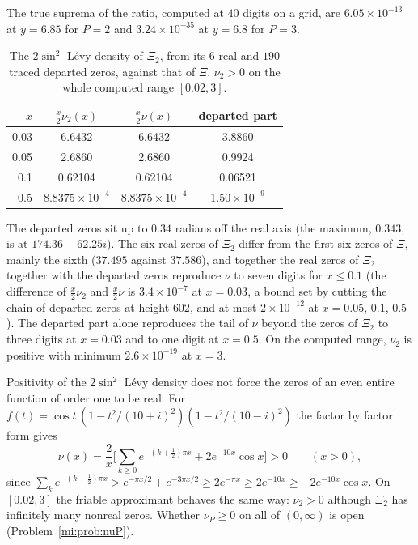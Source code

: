 The true suprema of the ratio, computed at $40$ digits on a grid, are $6.05\times10^{-13}$ at $y=6.85$ for $P=2$ and $3.24\times10^{-35}$ at $y=6.8$ for $P=3$.

\begin{table}[ht]
\centering
\footnotesize
\begin{tabular}{rccc}
\toprule
$x$ & $\frac x2\nu_2(x)$ & $\frac x2\nu(x)$ & departed part \\
\midrule
0.03 & 6.6432 & 6.6432 & 3.8860 \\
0.05 & 2.6860 & 2.6860 & 0.9924 \\
0.1 & 0.62104 & 0.62104 & 0.06521 \\
0.5 & $8.8375\times10^{-4}$ & $8.8375\times10^{-4}$ & $1.50\times10^{-9}$ \\
\bottomrule
\end{tabular}
\caption{The $2\sin^2$ L\'evy density of $\Xi_2$, from its $6$ real and $190$ traced departed zeros, against that of $\Xi$. $\nu_2>0$ on the whole computed range $[0.02,3]$.}
\label{mi:tab:levy}
\end{table}

The departed zeros sit up to $0.34$ radians off the real axis (the maximum, $0.343$, is at $174.36+62.25i$). The six real zeros of $\Xi_2$ differ from the first six zeros of $\Xi$, mainly the sixth ($37.495$ against $37.586$), and together the real zeros of $\Xi_2$ together with the departed zeros reproduce $\nu$ to seven digits for $x\le0.1$ (the difference of $\frac x2\nu_2$ and $\frac x2\nu$ is $3.4\times10^{-7}$ at $x=0.03$, a bound set by cutting the chain of departed zeros at height $602$, and at most $2\times10^{-12}$ at $x=0.05$, $0.1$, $0.5$). The departed part alone reproduces the tail of $\nu$ beyond the zeros of $\Xi_2$ to three digits at $x=0.03$ and to one digit at $x=0.5$. On the computed range, $\nu_2$ is positive with minimum $2.6\times10^{-19}$ at $x=3$.

\begin{remark}\label{mi:rem:signnotenough}
Positivity of the $2\sin^2$ L\'evy density does not force the zeros of an even entire function of order one to be real. For $f(t)=\cos t\,(1-t^2/(10+i)^2)(1-t^2/(10-i)^2)$ the factor by factor form gives
\[
\nu(x)=\frac2x\Big[\sum_{k\ge0}e^{-(k+\frac12)\pi x}+2e^{-10x}\cos x\Big]>0\qquad(x>0),
\]
since $\sum_ke^{-(k+\frac12)\pi x}>e^{-\pi x/2}+e^{-3\pi x/2}\ge2e^{-\pi x}\ge2e^{-10x}\ge-2e^{-10x}\cos x$. On $[0.02,3]$ the friable approximant behaves the same way: $\nu_2>0$ although $\Xi_2$ has infinitely many nonreal zeros. Whether $\nu_P\ge0$ on all of $(0,\infty)$ is open (Problem~\ref{mi:prob:nuP}).
\end{remark}

